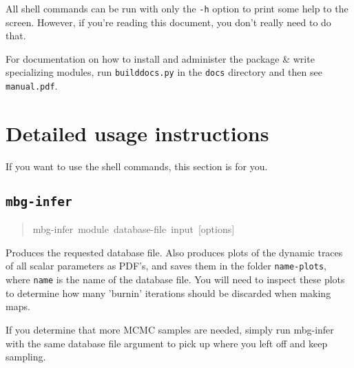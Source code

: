 All shell commands can be run with only the \texttt{-h} option to print some help to the
screen. However, if you're reading this document, you don't really need to do that.

For documentation on how to install and administer the package {\&} write specializing
modules, run \texttt{builddocs.py} in the \texttt{docs} directory and then see \texttt{manual.pdf}.





\section{Detailed usage instructions}
\label{sec:detailed-usage-instructions}

If you want to use the shell commands, this section is for you.





\subsection{\texttt{mbg-infer}}
\label{sec:mbg-infer}
\begin{quote}{\ttfamily \raggedright \noindent
mbg-infer~module~database-file~input~{[}options{]}
}\end{quote}

Produces the requested database file. Also produces plots of the dynamic traces of all
scalar parameters as PDF's, and saves them in the folder \texttt{name-plots}, where \texttt{name}
is the name of the database file. You will need to inspect these plots to determine how
many 'burnin' iterations should be discarded when making maps.

If you determine that more MCMC samples are needed, simply run mbg-infer with the same
database file argument to pick up where you left off and keep sampling.





